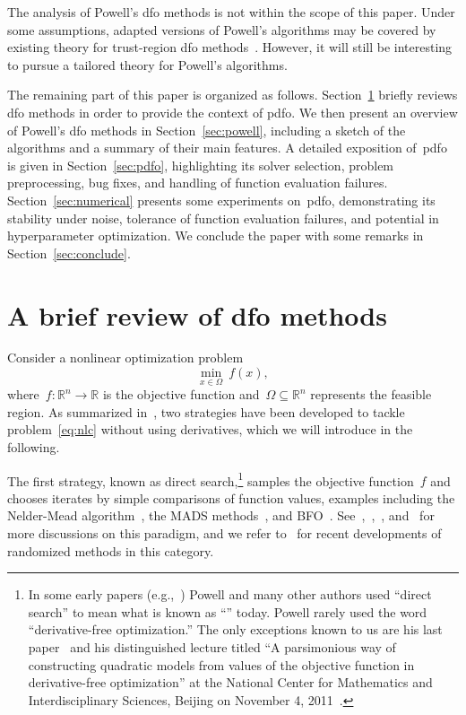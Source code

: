 \documentclass{article}
\numberwithin{equation}{section}
\theoremstyle{definition}
\theoremstyle{plain}
\theoremstyle{remark}
\newcommand*{\R}{\mathbb{R}}
\newcommand{\fset}{\Omega}
\newcommand{\obj}{f}
\begin{document}
The analysis of Powell's \gls{dfo} methods is not within the scope of this paper.
Under some assumptions, adapted versions of Powell's algorithms may be covered by existing theory for trust-region \gls{dfo} methods~\cite[Chapter~10]{Conn_Scheinberg_Vicente_2009b}.
However, it will still be interesting to pursue a tailored theory for Powell's algorithms.

The remaining part of this paper is organized as follows.
Section~\ref{sec:dfo} briefly reviews \gls{dfo} methods in order to provide the context of \gls{pdfo}.
We then present an overview of Powell's \gls{dfo} methods in Section~\ref{sec:powell}, including a sketch of the algorithms and a summary of their main features.
A detailed exposition of~\gls{pdfo} is given in Section~\ref{sec:pdfo}, highlighting its solver selection, problem preprocessing, bug fixes, and handling of function evaluation failures.
Section~\ref{sec:numerical} presents some experiments on~\gls{pdfo}, demonstrating its stability under noise, tolerance of function evaluation failures, and potential in hyperparameter optimization.
We conclude the paper with some remarks in Section~\ref{sec:conclude}.

\section{A brief review of \texorpdfstring{\gls{dfo}}{DFO} methods}
\label{sec:dfo}

Consider a nonlinear optimization problem
\begin{equation}
    \label{eq:nlc}
    \min_{x \in \fset} ~ \obj(x),
\end{equation}
where~$\obj \colon \R^n \to \R$ is the objective function and~$\fset \subseteq \R^n$ represents the feasible region.
As summarized in~\cite{Conn_Scheinberg_Vicente_2009b}, two strategies have been developed to tackle problem~\eqref{eq:nlc} without using derivatives, which we will introduce in the following.

The first strategy, known as direct search,\footnote{In some early papers (e.g.,~\cite{Powell_1994,Powell_1998}) Powell and many other authors used ``direct search'' to mean what is known as ``'' today.
Powell rarely used the word ``derivative-free optimization.''
The only exceptions known to us are his last paper~\cite{Powell_2015} and his distinguished lecture titled ``A parsimonious way of constructing quadratic models from values of the objective function in derivative-free optimization'' at the National Center for Mathematics and Interdisciplinary Sciences, Beijing on November 4, 2011~\cite{Buhmann_Fletcher_Iserles_Toint_2018}.} samples the objective function~$\obj$ and chooses iterates by simple comparisons of function values, examples including the Nelder-Mead algorithm~\cite{Nelder_Mead_1965}, the MADS methods~\cite{Audet_Dennis_2006,LeDigabel_2011}, and BFO~\cite{Porcelli_Toint_2017,Porcelli_Toint_2022}.
See~\cite{Kolda_Lewis_Torczon_2003},~\cite[Chapters~7 and~8]{Conn_Scheinberg_Vicente_2009b},~\cite[Part~3]{Audet_Hare_2017}, and~\cite[\S~2.1]{Larson_Menickelly_Wild_2019} for more discussions on this paradigm, and we refer to~\cite{Gratton_Etal_2015,Gratton_Etal_2019} for recent developments of randomized methods in this category.
\end{document}
